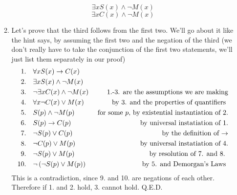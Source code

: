 \documentclass[12pt]{amsart}
\begin{document}
\begin{enumerate}
\begin{enumerate}
\[        \]
        \[
        \exists x S(x) \wedge \neg M(x)
        \]
        \[
        \exists x C(x) \wedge \neg M(x)
        \]
    \item
    Let's prove that the third follows from the first two.
    We'll go about it like the hint says, by assuming the
    first two and the negation of the third (we don't really have to
    take the conjunction of the first two statements, we'll just list them
    separately in our proof)
        \begin{align*}
            1. \quad & \forall x S(x) \rightarrow C(x) \hfill &\\
            2. \quad & \exists x S(x) \wedge \neg M(x)  \hfill &\\
            3. \quad & \neg \exists x C(x) \wedge \neg M(x)
                \hfill & \text{1.-3. are the assumptions we are making}\\
            4. \quad & \forall x  \neg C(x) \vee M(x)
                \hfill &\text{ by  3. and  the properties of quantifiers } \\
            5. \quad & S(p) \wedge \neg M(p)
               \hfill &\text{ for some $p$, by existential instantiation  of 2.} \\
            6. \quad & S(p) \rightarrow C(p)
               \hfill &\text{by universal instatiation of 1.} \\
            7. \quad & \neg S(p) \vee C(p)
                \hfill &\text{ by the definition of $\rightarrow$} \\
            8. \quad & \neg C(p) \vee M(p)
               \hfill &\text{ by universal instatiation of 4.} \\
            9. \quad & \neg S(p) \vee M(p)
                \hfill &\text{ by resolution of 7. and 8. } \\
           10. \quad & \neg \left( \neg S(p) \vee M(p) \right)
               \hfill &\text{ by 5. and Demorgan's Laws }
        \end{align*}
       This is a contradiction, since 9. and 10. are negations of each other.
        Therefore if 1. and 2. hold, 3. cannot hold. Q.E.D.
    \end{enumerate}


\end{enumerate}
\end{document}

